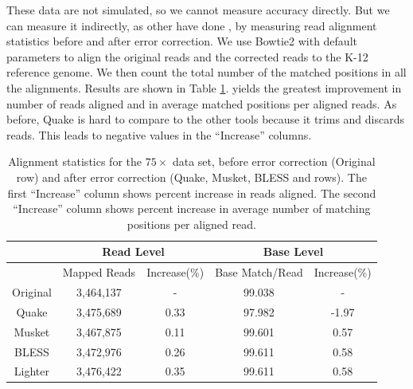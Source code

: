 \documentclass{bmcart}
\begin{document}
These data are not simulated, so we cannot measure accuracy directly.  But we can measure it indirectly, as other have done \cite{heo2014bless}, by measuring read alignment statistics before and after error correction.  We use Bowtie2 \cite{langmead2012fast} with default parameters to align the original reads and the corrected reads to the \ecoli K-12 reference genome.  We then count the total number of the matched positions in all the alignments.  Results are shown in Table \ref{table:ecoli_alignment}.  \tool yields the greatest improvement in number of reads aligned and in average matched positions per aligned reads.  As before, Quake is hard to compare to the other tools because it trims and discards reads.  This leads to negative values in the ``Increase'' columns.

\begin{table}
\centering
\begin{tabular}{|c|c|c||c|c|} \hline
	 & \multicolumn{2}{|c||}{Read Level} & \multicolumn{2}{|c|}{Base Level} \\ \hline
     & Mapped Reads & Increase(\%) & Base Match/Read & Increase(\%) \\ \hline
Original & 	3,464,137	 & - & 99.038	& - \\ \hline
Quake	& 3,475,689	& 0.33	& 97.982	& -1.97  \\ \hline
Musket	& 3,467,875	& 0.11	& 99.601	& 0.57  \\ \hline
BLESS	& 3,472,976	& 0.26	& 99.611	& 0.58  \\ \hline
Lighter	&  3,476,422	& 0.35	& 99.611	& 0.58  \\ \hline
\end{tabular}
\caption{Alignment statistics for the $75\times$ \ecoli data set, before error correction (Original row) and after error correction (Quake, Musket, BLESS and \tool rows).  The first ``Increase'' column shows percent increase in reads aligned.  The second ``Increase'' column shows percent increase in average number of matching positions per aligned read.\label{table:ecoli_alignment}}
\end{table}


\end{document}
